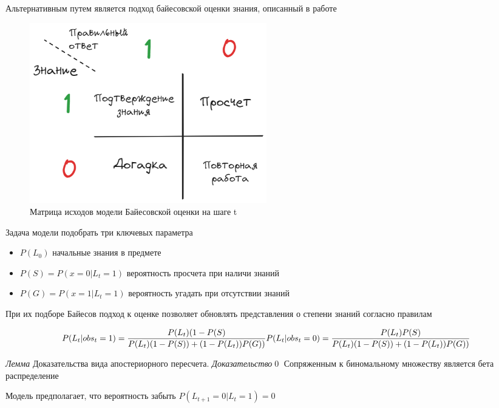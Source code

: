 Альтернативным путем является подход байесовской оценки знания,
описанный в работе \cite{corbett1994knowledge}


\begin{figure}[h]
    \centering
    \includegraphics[width=0.5\textwidth]{assets/work/rating/bkt.excalidraw.png}
    \caption{Матрица исходов модели Байесовской оценки на шаге t}
    \label{bkt}
\end{figure}

Задача модели подобрать три ключевых параметра \begin{itemize}
    \item $P(L_0)$ начальные знания в предмете
    \item $P(S) = P(x=0| L_t = 1)$ вероятность просчета при наличи знаний
    \item  $P(G) = P(x=1| L_t = 1)$ вероятность угадать при отсутствии знаний
\end{itemize}

При их подборе Байесов подход к оценке
позволяет обновлять представления о
степени знаний согласно правилам

$$  
    P(L_t| obs_t=1) = \frac{P(L_t)(1-P(S)}{P(L_t)(1-P(S)) + (1-P(L_t))P(G))} \\
    P(L_t| obs_t=0) = \frac{P(L_t)P(S)}{P(L_t)(1-P(S)) + (1-P(L_t))P(G))} 
$$

\textit{Лемма} Доказательства вида апостериорного
 пересчета.
\textit{Доказательство}\qed
Сопряженным к биномальному множеству
является бета распределение 

Модель предполагает, что вероятность забыть $ P(L_{t+1}=0|L_t=1)=0$

\blacksquare
